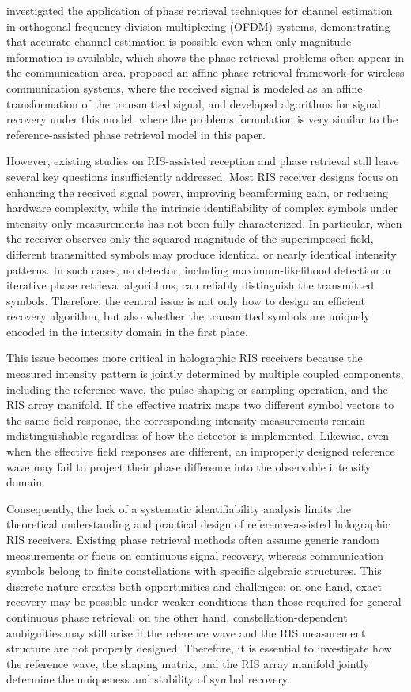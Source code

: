 \documentclass[journal]{IEEEtran}
\begin{document}
\cite{ofdm_phase_retrieval} investigated the application of phase retrieval techniques for channel estimation in orthogonal frequency-division multiplexing (OFDM) systems, demonstrating that accurate channel estimation is possible even when only magnitude information is available, which shows the phase retrieval problems often appear in the communication area. \cite{affine_phase_retrieval} proposed an affine phase retrieval framework for wireless communication systems, where the received signal is modeled as an affine transformation of the transmitted signal, and developed algorithms for signal recovery under this model, where the problems formulation is very similar to the reference-assisted phase retrieval model in this paper. 

However, existing studies on RIS-assisted reception and phase retrieval still leave several key questions insufficiently addressed. Most RIS receiver designs focus on enhancing the received signal power, improving beamforming gain, or reducing hardware complexity, while the intrinsic identifiability of complex symbols under intensity-only measurements has not been fully characterized. In particular, when the receiver observes only the squared magnitude of the superimposed field, different transmitted symbols may produce identical or nearly identical intensity patterns. In such cases, no detector, including maximum-likelihood detection or iterative phase retrieval algorithms, can reliably distinguish the transmitted symbols. Therefore, the central issue is not only how to design an efficient recovery algorithm, but also whether the transmitted symbols are uniquely encoded in the intensity domain in the first place.

This issue becomes more critical in holographic RIS receivers because the measured intensity pattern is jointly determined by multiple coupled components, including the reference wave, the pulse-shaping or sampling operation, and the RIS array manifold. If the effective matrix maps two different symbol vectors to the same field response, the corresponding intensity measurements remain indistinguishable regardless of how the detector is implemented. Likewise, even when the effective field responses are different, an improperly designed reference wave may fail to project their phase difference into the observable intensity domain.

Consequently, the lack of a systematic identifiability analysis limits the theoretical understanding and practical design of reference-assisted holographic RIS receivers. Existing phase retrieval methods often assume generic random measurements or focus on continuous signal recovery, whereas communication symbols belong to finite constellations with specific algebraic structures. This discrete nature creates both opportunities and challenges: on one hand, exact recovery may be possible under weaker conditions than those required for general continuous phase retrieval; on the other hand, constellation-dependent ambiguities may still arise if the reference wave and the RIS measurement structure are not properly designed. Therefore, it is essential to investigate how the reference wave, the shaping matrix, and the RIS array manifold jointly determine the uniqueness and stability of symbol recovery.
\end{document}
